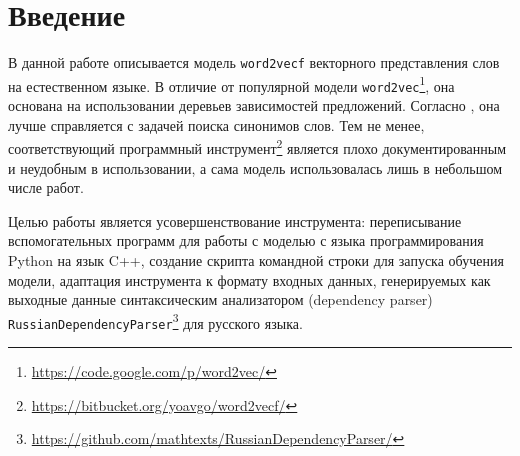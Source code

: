\section{Введение}
\label{sec:Chapter1} 

В данной работе описывается модель \texttt{word2vecf} векторного представления слов на естественном языке. В отличие от популярной модели \texttt{word2vec}\footnote{\url{https://code.google.com/p/word2vec/}}, она основана на использовании деревьев зависимостей предложений. Согласно \cite{levy1}, она лучше справляется с задачей поиска синонимов слов. Тем не менее, соответствующий программный инструмент\footnote{\url{https://bitbucket.org/yoavgo/word2vecf/}} является плохо документированным и неудобным в использовании, а сама модель использовалась лишь в небольшом числе работ.

Целью работы является усовершенствование инструмента: переписывание вспомогательных программ для работы с моделью с языка программирования Python на язык C++, создание скрипта командной строки для запуска обучения модели, адаптация инструмента к формату входных данных, генерируемых как выходные данные синтаксическим анализатором (dependency parser) \texttt{RussianDependencyParser}\footnote
{\url{https://github.com/mathtexts/RussianDependencyParser/}} для русского языка.